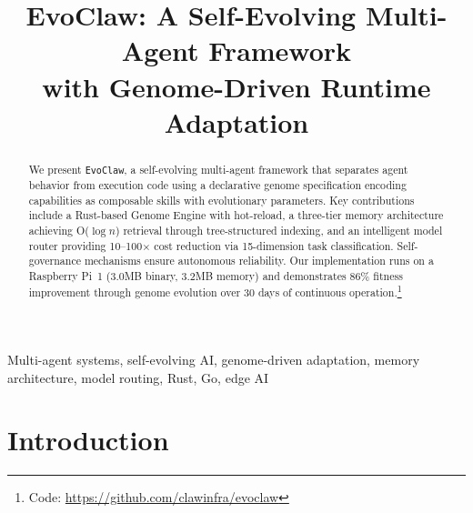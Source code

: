 \documentclass[conference]{IEEEtran}
\newcommand{\evoclaw}{\texttt{EvoClaw}\xspace}
\begin{document}

\title{EvoClaw: A Self-Evolving Multi-Agent Framework\\with Genome-Driven Runtime Adaptation}

\author{
\and
{}
\and
{}
\and
{}
}

\maketitle

\begin{abstract}
We present \evoclaw{}, a self-evolving multi-agent framework that separates agent behavior from execution code using a declarative genome specification encoding capabilities as composable skills with evolutionary parameters. Key contributions include a Rust-based Genome Engine with hot-reload, a three-tier memory architecture achieving O($\log n$) retrieval through tree-structured indexing, and an intelligent model router providing 10--100$\times$ cost reduction via 15-dimension task classification. Self-governance mechanisms ensure autonomous reliability. Our implementation runs on a Raspberry Pi~1 (3.0MB binary, 3.2MB memory) and demonstrates 86\% fitness improvement through genome evolution over 30 days of continuous operation.\footnote{Code: \url{https://github.com/clawinfra/evoclaw}}
\end{abstract}

\begin{IEEEkeywords}
Multi-agent systems, self-evolving AI, genome-driven adaptation, memory architecture, model routing, Rust, Go, edge AI
\end{IEEEkeywords}

\section{Introduction}
\end{document}

